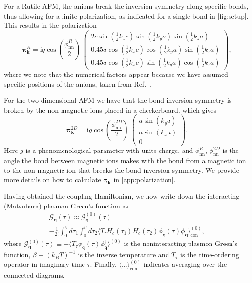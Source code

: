\documentclass[aps,prb,reprint,twocolumns,superscriptaddress,nofootinbib]{revtex4-2}
\newcommand{\ii}{\mathrm{i}}
\begin{document}
	 
	For a Rutile AFM, the anions break the inversion symmetry along specific bonds, thus allowing for a finite polarization, as indicated for a single bond in \cref{fig:setup}. This results in the polarization
	\begin{equation}
		\bm \pi_{\bm k}^R = \ii g \cos\left(\frac{\phi_{\mathrm{nn}}^R}{2} \right)\ \begin{pmatrix}
			2c \sin(\frac12 k_x c) \sin(\frac12 k_y a) \sin(\frac12 k_z a) \\
			0.45a \cos(\frac12 k_x c) \cos(\frac12 k_y a) \sin(\frac12 k_z a)\\
			0.45a \cos(\frac12 k_x c) \sin(\frac12 k_y a) \cos(\frac12 k_z a)
		\end{pmatrix},
		\label{eq:pik-Rutiles}
	\end{equation}
	where we note that the numerical factors appear because we have assumed specific positions of the anions, taken from Ref.~\cite{hainesNeutronDiffractionStudy1997}. 
	
	For the two-dimensional AFM we have that the bond inversion symmetry is broken by the non-magnetic ions placed in a checkerboard, which gives 
	\begin{equation}
		\bm \pi_{\bm k}^{2D} = \ii g \cos\left(\frac{\phi_{\mathrm{nn}}^{2D}}{2}\right)\ \begin{pmatrix}
			a\sin( k_y a) \\
			a\sin(k_x a) \\ 
			0
		\end{pmatrix}.
		\label{eq:pik-cuprates}
	\end{equation}
	Here $g$ is a phenomenological parameter with units charge, and $\phi_{\mathrm{nn}}^{R}$, $\phi_{\mathrm{nn}}^{2D}$  is the angle the bond between magnetic ions makes with the bond from a magnetic ion to the non-magnetic ion that breaks the bond inversion symmetry. We provide more details on how to calculate $\bm \pi_{\bm k}$ in \cref{app:polarization}.
	
	Having obtained the coupling Hamiltonian, we now write down the interacting (Matsubara) plasmon Green's function \cite{stoofUltracoldQuantumFields2009,rastelliStatisticalMechanicsMagnetic2013} as
	\begin{multline}
		\mathcal G_{\bm q}(\tau) \approx \mathcal G_{\bm q}^{(0)}(\tau)\\ -\frac{1}{2!} \int_0^\beta d\tau_1 \int_0^\beta d\tau_2 \langle T_\tau H_c(\tau_1)H_c(\tau_2) \phi_{\bm q}(\tau)\phi_{\bm q}^\dagger
		\rangle_{\mathrm{con}}^{(0)}, \label{eq:Gint}
	\end{multline}
	where $ \mathcal G_{\bm q}^{(0)}(\tau)\equiv -\langle T_\tau \phi_{\bm q}(\tau)\phi_{\bm q}^\dagger \rangle^{(0)}$ is the noninteracting plasmon Green's function, $\beta\equiv(k_B T)^{-1}$ is the inverse temperature and $T_\tau$ is the time-ordering operator in imaginary time $\tau$. Finally, $\langle\dots\rangle_{\mathrm{con}}^{(0)}$ indicates averaging over the connected diagrams.
	
\end{document}
